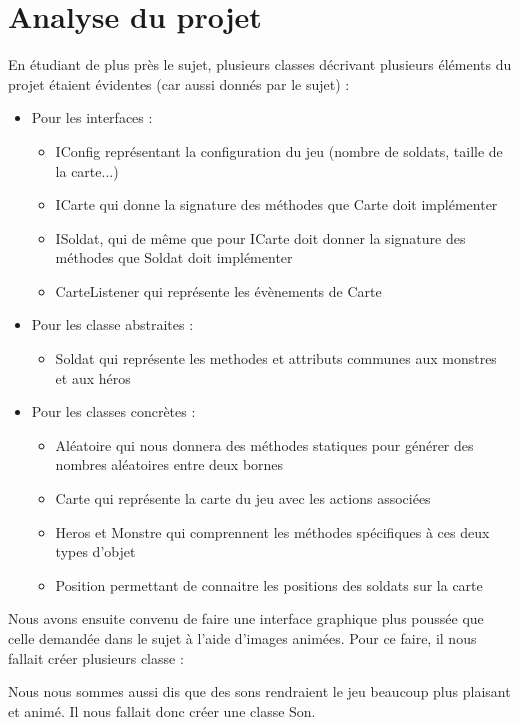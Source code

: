 \documentclass{report}
\begin{document}
\section{Analyse du projet}
En étudiant de plus près le sujet, plusieurs classes décrivant plusieurs éléments du projet étaient évidentes (car aussi donnés par le sujet) :
\begin{itemize}
  \item Pour les interfaces : 
        \begin{itemize}
         \item IConfig représentant la configuration du jeu (nombre de soldats, taille de la carte...)
         \item ICarte qui donne la signature des méthodes que Carte doit implémenter
         \item ISoldat, qui de même que pour ICarte doit donner la signature des méthodes que Soldat doit implémenter
         \item CarteListener qui représente les évènements de Carte
        \end{itemize}
  \item Pour les classe abstraites :
	\begin{itemize}
	 \item Soldat qui représente les methodes et attributs communes aux monstres et aux héros
	\end{itemize}
  \item Pour les classes concrètes :
	\begin{itemize}
	 \item Aléatoire qui nous donnera des méthodes statiques pour générer des nombres aléatoires entre deux bornes
	 \item Carte qui représente la carte du jeu avec les actions associées
	 \item Heros et Monstre qui comprennent les méthodes spécifiques à ces deux types d'objet
	 \item Position permettant de connaitre les positions des soldats sur la carte
	\end{itemize}
\end{itemize}

Nous avons ensuite convenu de faire une interface graphique plus poussée que celle demandée dans le sujet à l'aide d'images animées.
Pour ce faire, il nous fallait créer plusieurs classe : %

Nous nous sommes aussi dis que des sons rendraient le jeu beaucoup plus plaisant et animé. Il nous fallait donc créer une classe Son.
\end{document}
